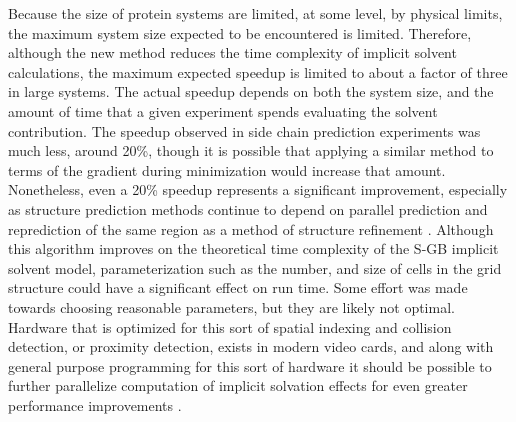 Because the size of protein systems are limited, at some level, by physical limits, the maximum system size expected to be encountered is limited.
Therefore, although the new method reduces the time complexity of implicit solvent calculations, the maximum expected speedup is limited to about a factor of three in large systems.
The actual speedup depends on both the system size, and the amount of time that a given experiment spends evaluating the solvent contribution.
The speedup observed in side chain prediction experiments was much less, around 20\%, though it is possible that applying a similar method to terms of the gradient during minimization would increase that amount.
Nonetheless, even a 20\% speedup represents a significant improvement, especially as structure prediction methods continue to depend on parallel prediction and reprediction of the same region as a method of structure refinement \cite{goldfeld2013loop}.
Although this algorithm improves on the theoretical time complexity of the S-GB implicit solvent model, parameterization such as the number, and size of cells in the grid structure could have a significant effect on run time.
Some effort was made towards choosing reasonable parameters, but they are likely not optimal.
Hardware that is optimized for this sort of spatial indexing and collision detection, or proximity detection, exists in modern video cards, and along with general purpose programming for this sort of hardware it should be possible to further parallelize computation of implicit solvation effects for even greater performance improvements \cite{harris2008cuda}.

